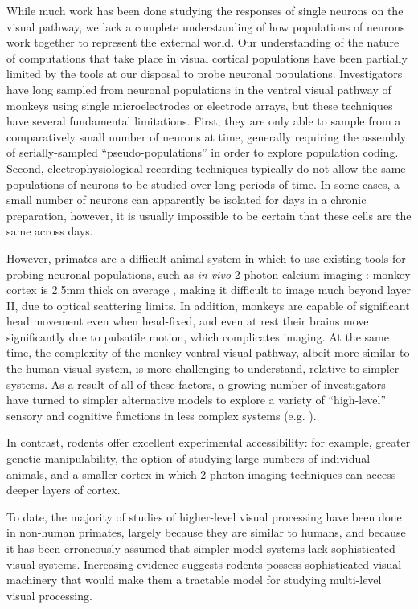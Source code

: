  While much work has been done studying the responses of single neurons on the visual pathway, we lack a complete understanding of how populations of neurons work together to represent the external world. Our understanding of the nature of computations that take place in visual cortical populations have been partially limited by the tools at our disposal to probe neuronal populations.   Investigators have long sampled from neuronal populations in the ventral visual pathway of monkeys using single microelectrodes or electrode arrays, but these techniques have several fundamental limitations. First, they are only able to sample from a comparatively small number of neurons at time, generally requiring the assembly of serially-sampled ``pseudo-populations'' in order to explore population coding. Second, electrophysiological recording techniques typically do not allow the same populations of neurons to be studied over long periods of time. In some cases, a small number of neurons can apparently be isolated for days in a chronic preparation, however, it is usually impossible to be certain that these cells are the same across days.

However, primates are a difficult animal system in which to use existing tools for probing neuronal populations, such as \textit{in vivo} 2-photon calcium imaging \cite{Ohki2005}: monkey cortex is 2.5mm thick on average \cite{Koo:2012aa}, making it difficult to image much beyond layer II, due to optical scattering limits. In addition, monkeys are capable of significant head movement even when head-fixed, and even at rest their brains move significantly due to pulsatile motion, which complicates imaging. At the same time, the complexity of the monkey ventral visual pathway, albeit more similar to the human visual system, is more challenging to understand, relative to simpler systems. As a result of all of these factors, a growing number of investigators have turned to simpler alternative models to explore a variety of ``high-level'' sensory and cognitive functions in less complex systems (e.g. \cite{kepecs2008neural, zeeb2009serotonergic}).

In contrast, rodents offer excellent experimental accessibility: for example, greater genetic manipulability, the option of studying large numbers of individual animals, and a smaller cortex in which 2-photon imaging techniques can access deeper layers of cortex. 

To date, the majority of studies of higher-level visual processing have been done in non-human primates, largely because they are similar to humans, and because it has been erroneously assumed that simpler model systems lack sophisticated visual systems. Increasing evidence suggests rodents possess sophisticated visual machinery that would make them a tractable model for studying multi-level visual processing.

